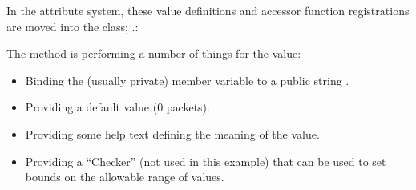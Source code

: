 \documentclass[letterpaper,10pt,english]{sphinxmanual}
\renewcommand{\sphinxcode}[1]{\texttt{\small{#1}}}
\begin{document}
In the  attribute system, these value definitions and accessor function
registrations are moved into the \sphinxcode{} class; .:

\begin{sphinxVerbatim}[commandchars=\\\{\}]
 

 
       
     
     
     
                     
                    
                    

   
\end{sphinxVerbatim}

The \sphinxcode{} method is performing a number of things for the
\sphinxcode{} value:
\begin{itemize}
\item {} 
Binding the (usually private) member variable \sphinxcode{}
to a public string \sphinxcode{}.

\item {} 
Providing a default value (0 packets).

\item {} 
Providing some help text defining the meaning of the value.

\item {} 
Providing a “Checker” (not used in this example) that can be used to set
bounds on the allowable range of values.

\end{itemize}
\end{document}
